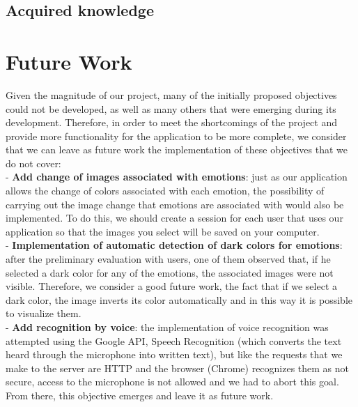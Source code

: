 \subsection{Acquired knowledge}
\label{cap12:sec:conocimientos adquiridos}

\section{Future Work}
\label{cap12:sec:trabajo futuro}

Given the magnitude of our project, many of the initially proposed objectives could not be developed, as well as many others that were emerging during its development.
Therefore, in order to meet the shortcomings of the project and provide more functionality for the application to be more complete, we consider that we can leave as future work the implementation of these objectives that we do not cover:\\



- \textbf{Add change of images associated with emotions}: just as our application allows the change of colors associated with each emotion, the possibility of carrying out the image change that emotions are associated with would also be implemented. To do this, we should create a session for each user that uses our application so that the images you select will be saved on your computer.\\


- \textbf{Implementation of automatic detection of dark colors for emotions}: after the preliminary evaluation with users, one of them observed that, if he selected a dark color for any of the emotions, the associated images were not visible. Therefore, we consider a good future work, the fact that if we select a dark color, the image inverts its color automatically and in this way it is possible to visualize them.\\ 



- \textbf{Add recognition by voice}: the implementation of voice recognition was attempted using the Google API, Speech Recognition (which converts the text heard through the microphone into written text), but like the requests that we make to the server are HTTP and the browser (Chrome) recognizes them as not secure, access to the microphone is not allowed and we had to abort this goal. From there, this objective emerges and leave it as future work.\\



